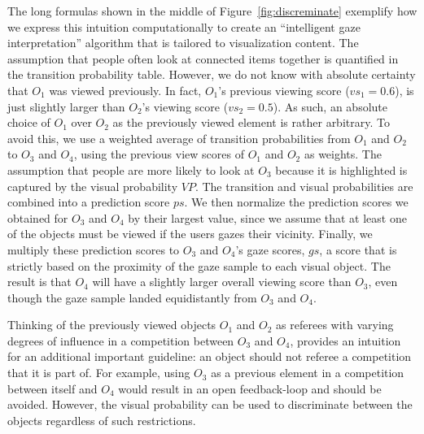 The long formulas shown in the middle of Figure~\ref{fig:discreminate} exemplify how we express this intuition computationally to create an ``intelligent gaze interpretation'' algorithm that is tailored to visualization content. The assumption that people often look at connected items together is quantified in the transition probability table. However, we do not know with absolute certainty that $O_1$ was viewed previously. In fact, $O_1$'s previous viewing score ($vs_1=0.6$), is just slightly larger than $O_2$'s viewing score ($vs_2=0.5$). As such, an absolute choice of $O_1$ over $O_2$ as the previously viewed element is rather arbitrary. To avoid this, we use a weighted average of transition probabilities from $O_1$ and $O_2$ to $O_3$ and $O_4$, using the previous view scores of $O_1$ and $O_2$ as weights.  The assumption that people are more likely to look at $O_3$ because it is highlighted is captured by the visual probability $VP$. The transition and visual probabilities are combined into a prediction score $ps$. We then normalize the prediction scores we obtained for $O_3$ and $O_4$ by their largest value, since we assume that at least one of the objects must be viewed if the users gazes their vicinity. Finally, we multiply these prediction scores to $O_3$ and $O_4$'s gaze scores, $gs$, a score that is strictly based on the proximity of the gaze sample to each visual object. The result is that $O_4$ will have a slightly larger overall viewing score than $O_3$, even though the gaze sample landed equidistantly from $O_3$ and $O_4$. 

Thinking of the previously viewed objects $O_1$ and $O_2$ as referees with varying degrees of influence in a competition between $O_3$ and $O_4$, provides an intuition for an additional important guideline: an object should not referee a competition that it is part of. For example, using $O_3$ as a previous element in a competition between itself and $O_4$ would result in an open feedback-loop and should be avoided. However, the visual probability can be used to discriminate between the objects regardless of such restrictions.


